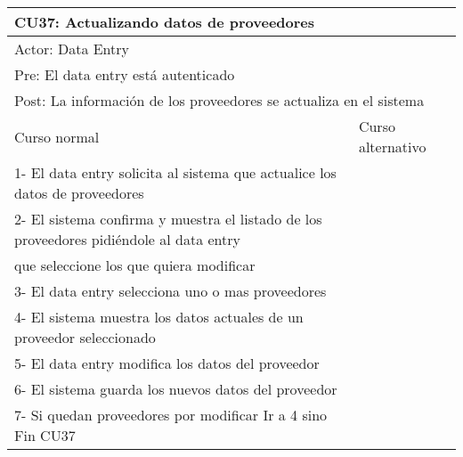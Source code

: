 \begin{table}[H]
  \begin{adjustbox}{max width = \textwidth}
  \begin{tabular}{|l|l|}
    \hline
    \multicolumn{2}{|l|}{CU37: Actualizando datos de proveedores} \\\hline
    \multicolumn{2}{|l|}{Actor: Data Entry} \\\hline
    \multicolumn{2}{|l|}{Pre: El data entry está autenticado} \\\hline
    \multicolumn{2}{|l|}{Post: La información de los proveedores se actualiza en el sistema} \\\hline
     Curso normal & Curso alternativo\\ \hline
	 1- El data entry solicita al sistema que actualice los datos de proveedores & \\ \hline
     2- El sistema confirma y muestra el listado de los proveedores pidiéndole al data entry \\ que seleccione los que quiera modificar & \\ \hline
     3- El data entry selecciona uno o mas proveedores & \\ \hline
     4- El sistema muestra los datos actuales de un proveedor seleccionado & \\ \hline
     5- El data entry modifica los datos del proveedor & \\ \hline
     6- El sistema guarda los nuevos datos del proveedor & \\ \hline
     7- Si quedan proveedores por modificar Ir a 4 sino Fin CU37 & \\ \hline
  \end{tabular}
  \end{adjustbox}
\end{table}


